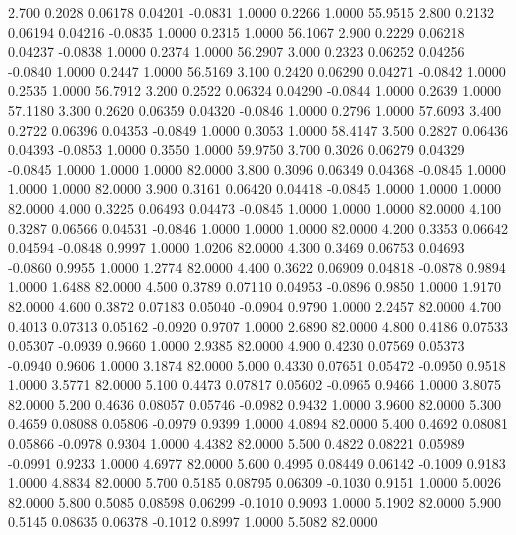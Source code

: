    2.700   0.2028   0.06178   0.04201  -0.0831   1.0000   0.2266   1.0000  55.9515
   2.800   0.2132   0.06194   0.04216  -0.0835   1.0000   0.2315   1.0000  56.1067
   2.900   0.2229   0.06218   0.04237  -0.0838   1.0000   0.2374   1.0000  56.2907
   3.000   0.2323   0.06252   0.04256  -0.0840   1.0000   0.2447   1.0000  56.5169
   3.100   0.2420   0.06290   0.04271  -0.0842   1.0000   0.2535   1.0000  56.7912
   3.200   0.2522   0.06324   0.04290  -0.0844   1.0000   0.2639   1.0000  57.1180
   3.300   0.2620   0.06359   0.04320  -0.0846   1.0000   0.2796   1.0000  57.6093
   3.400   0.2722   0.06396   0.04353  -0.0849   1.0000   0.3053   1.0000  58.4147
   3.500   0.2827   0.06436   0.04393  -0.0853   1.0000   0.3550   1.0000  59.9750
   3.700   0.3026   0.06279   0.04329  -0.0845   1.0000   1.0000   1.0000  82.0000
   3.800   0.3096   0.06349   0.04368  -0.0845   1.0000   1.0000   1.0000  82.0000
   3.900   0.3161   0.06420   0.04418  -0.0845   1.0000   1.0000   1.0000  82.0000
   4.000   0.3225   0.06493   0.04473  -0.0845   1.0000   1.0000   1.0000  82.0000
   4.100   0.3287   0.06566   0.04531  -0.0846   1.0000   1.0000   1.0000  82.0000
   4.200   0.3353   0.06642   0.04594  -0.0848   0.9997   1.0000   1.0206  82.0000
   4.300   0.3469   0.06753   0.04693  -0.0860   0.9955   1.0000   1.2774  82.0000
   4.400   0.3622   0.06909   0.04818  -0.0878   0.9894   1.0000   1.6488  82.0000
   4.500   0.3789   0.07110   0.04953  -0.0896   0.9850   1.0000   1.9170  82.0000
   4.600   0.3872   0.07183   0.05040  -0.0904   0.9790   1.0000   2.2457  82.0000
   4.700   0.4013   0.07313   0.05162  -0.0920   0.9707   1.0000   2.6890  82.0000
   4.800   0.4186   0.07533   0.05307  -0.0939   0.9660   1.0000   2.9385  82.0000
   4.900   0.4230   0.07569   0.05373  -0.0940   0.9606   1.0000   3.1874  82.0000
   5.000   0.4330   0.07651   0.05472  -0.0950   0.9518   1.0000   3.5771  82.0000
   5.100   0.4473   0.07817   0.05602  -0.0965   0.9466   1.0000   3.8075  82.0000
   5.200   0.4636   0.08057   0.05746  -0.0982   0.9432   1.0000   3.9600  82.0000
   5.300   0.4659   0.08088   0.05806  -0.0979   0.9399   1.0000   4.0894  82.0000
   5.400   0.4692   0.08081   0.05866  -0.0978   0.9304   1.0000   4.4382  82.0000
   5.500   0.4822   0.08221   0.05989  -0.0991   0.9233   1.0000   4.6977  82.0000
   5.600   0.4995   0.08449   0.06142  -0.1009   0.9183   1.0000   4.8834  82.0000
   5.700   0.5185   0.08795   0.06309  -0.1030   0.9151   1.0000   5.0026  82.0000
   5.800   0.5085   0.08598   0.06299  -0.1010   0.9093   1.0000   5.1902  82.0000
   5.900   0.5145   0.08635   0.06378  -0.1012   0.8997   1.0000   5.5082  82.0000
